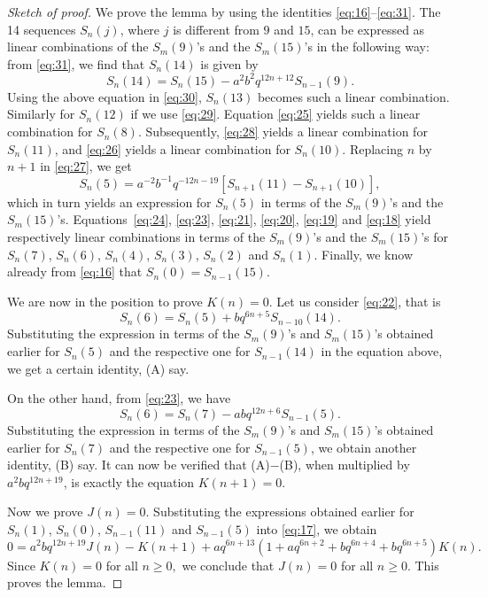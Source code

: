 \documentclass[12pt,twoside]{amsart}
\theoremstyle{remark}
\numberwithin{equation}{section}
\begin{document}
\begin{proof}[Sketch of proof]
We prove the lemma by using the 
identities \eqref{eq:16}--\eqref{eq:31}. The 14
sequences $S_n(j)$, where $j$ is different from $9$ and $15$, 
can be expressed as linear combinations of the $S_m(9)$'s and
the $S_m(15)$'s in the following way: from \eqref{eq:31}, 
we find that $S_n(14)$ is given by
$$S_n(14)=S_n(15)-a^2b^2q^{12n+12}S_{n-1}(9).$$
Using the above equation in \eqref{eq:30}, $S_n(13)$ becomes such a linear
combination. Similarly for $S_n(12)$ if we use \eqref{eq:29}. 
Equation \eqref{eq:25}
yields such a linear combination for $S_n(8).$
Subsequently, \eqref{eq:28} yields a linear combination for 
$S_n(11)$, and \eqref{eq:26} yields a linear combination for $S_n(10).$
Replacing $n$ by $n+1$ in \eqref{eq:27}, we get 
$$S_n(5) =
a^{-2}b^{-1}q^{-12n-19}[S_{n+1}(11)-S_{n+1}(10)],$$ 
which in turn yields an
expression for $S_n(5)$ in terms of the $S_m(9)$'s and the $S_m(15)$'s. 
Equations~\eqref{eq:24}, \eqref{eq:23},  \eqref{eq:21},
 \eqref{eq:20},  \eqref{eq:19} and  \eqref{eq:18}
yield respectively linear combinations 
in terms of the $S_m(9)$'s and the $S_m(15)$'s for
$S_n(7)$, $S_n(6)$, $S_n(4)$, $S_n(3)$, $S_n(2)$ and $S_n(1)$. 
Finally, we know already from
 \eqref{eq:16} that $S_n(0) = S_{n-1}(15)$.

We are now in the position to prove $K(n) = 0.$
Let us consider  \eqref{eq:22}, that is 
$$S_n(6) = S_n(5)+bq^{6n+5}S_{n-10}(14).$$
Substituting the expression in terms of the $S_m(9)$'s
and $S_m(15)$'s obtained earlier for $S_n(5)$ and
the respective one for $S_{n-1}(14)$ in the equation above, 
we get a certain identity, (A) say.

On the other hand, from \eqref{eq:23}, we have 
$$S_n(6) = S_n(7)-abq^{12n+6}S_{n-1}(5).$$
Substituting the expression in terms of the $S_m(9)$'s
and $S_m(15)$'s obtained earlier for 
$S_n(7)$ and the respective one for $S_{n-1}(5)$, 
we obtain another identity, (B) say.
It can now be verified that (A)$-$(B), when multiplied by 
$a^2bq^{12n+19}$, is exactly the equation $K(n+1) = 0.$ 

Now we prove $J(n) = 0.$ 
Substituting the expressions obtained earlier
for $S_n(1)$, $S_n(0)$, $S_{n-1}(11)$
and $S_{n-1}(5)$ into \eqref{eq:17}, we obtain
$$ 0 =
a^2bq^{12n+19}J(n)-K(n+1)+aq^{6n+13}(1+aq^{6n+2}+bq^{6n+4}+bq^{6n+5})K(n).$$
Since $K(n) = 0$ for all $ n \geq 0,$ we conclude that $J(n) = 0$
for all $n\ge0$. This proves the lemma.
\end{proof}
\end{document}
